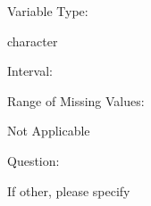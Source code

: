 \documentclass[
]{article}
\begin{document}
\begin{minipage}[t]{0.3\linewidth}

Variable Type:

\end{minipage}%
\begin{minipage}[t]{0.7\linewidth}

character

\end{minipage}

\begin{minipage}[t]{0.3\linewidth}

Interval:

\end{minipage}%
\begin{minipage}[t]{0.7\linewidth}

\end{minipage}

\begin{minipage}[t]{0.3\linewidth}

Range of Missing Values:

\end{minipage}%
\begin{minipage}[t]{0.7\linewidth}

Not Applicable

\end{minipage}

\begin{minipage}[t]{0.3\linewidth}

Question:

\end{minipage}%
\begin{minipage}[t]{0.7\linewidth}

If other, please specify

\end{minipage}
\end{document}
